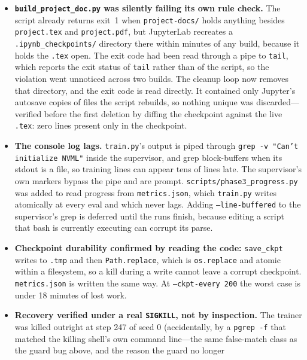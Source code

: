 \documentclass[11pt,a4paper]{article}
\newcommand{\code}[1]{\texttt{\small #1}}
\newcommand{\warn}[1]{\textcolor{warncol}{\textbf{#1}}}
\begin{document}
\begin{itemize}
line that merely mentions the script---an editor, a grep, the very command that
launched the guard. It returned a false positive on its first poll and left
training stopped. Liveness is now read from a pidfile and confirmed against that
pid's \code{/proc/<pid>/cmdline}.
\item \warn{\code{build\_project\_doc.py} was silently failing its own rule
check.} The script already returns exit~1 when \code{project-docs/} holds
anything besides \code{project.tex} and \code{project.pdf}, but JupyterLab
recreates a \code{.ipynb\_checkpoints/} directory there within minutes of any
build, because it holds the \code{.tex} open. The exit code had been read
through a pipe to \code{tail}, which reports the exit status of \code{tail}
rather than of the script, so the violation went unnoticed across two builds.
The cleanup loop now removes that directory, and the exit code is read directly.
It contained only Jupyter's autosave copies of files the script rebuilds, so
nothing unique was discarded---verified before the first deletion by diffing the
checkpoint against the live \code{.tex}: zero lines present only in the
checkpoint.
\item \warn{The console log lags.} \code{train.py}'s output is piped through
\code{grep -v "Can't initialize NVML"} inside the supervisor, and grep
block-buffers when its stdout is a file, so training lines can appear tens of
lines late. The supervisor's own markers bypass the pipe and are prompt.
\code{scripts/phase3\_progress.py} was added to read progress from
\code{metrics.json}, which \code{train.py} writes atomically at every eval and
which never lags. Adding \code{--line-buffered} to the supervisor's grep is
deferred until the runs finish, because editing a script that bash is currently
executing can corrupt its parse.
\item \textbf{Checkpoint durability confirmed by reading the code:}
\code{save\_ckpt} writes to \code{.tmp} and then \code{Path.replace}, which is
\code{os.replace} and atomic within a filesystem, so a kill during a write
cannot leave a corrupt checkpoint. \code{metrics.json} is written the same way.
At \code{--ckpt-every 200} the worst case is under 18 minutes of lost work.
\item \textbf{Recovery verified under a real \code{SIGKILL}, not by inspection.}
The trainer was killed outright at step 247 of seed 0 (accidentally, by a
\code{pgrep -f} that matched the killing shell's own command line---the same
false-match class as the guard bug above, and the reason the guard no longer

\end{itemize}
\end{document}
